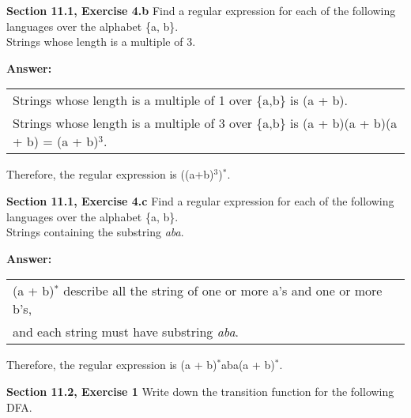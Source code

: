 \documentclass[12pt]{article}
\begin{document}
\textbf{Section 11.1, Exercise 4.b}  Find a regular expression for each of the following languages over the
alphabet \{a, b\}.\\
Strings whose length is a multiple of 3.

\textbf{Answer:}

\begin{center}
\begin{tabular}{l}
Strings whose length is a multiple of 1 over \{a,b\} is (a + b).\\
Strings whose length is a multiple of 3 over \{a,b\} is (a + b)(a + b)(a + b) = (a + b)$^3$.\\
\end{tabular}
\end{center}

\begin{center}
Therefore, the regular expression is ((a+b)$^3$)$^*$.\\
\end{center}

\textbf{Section 11.1, Exercise 4.c}  Find a regular expression for each of the following languages over the
alphabet \{a, b\}.\\
 Strings containing the substring \emph{aba}.
 
\textbf{Answer:}

\begin{center}
\begin{tabular}{l}
(a + b)$^*$ describe all the string of one or more a's and one or more b's, \\
and each string must have substring \emph{aba}.\\
\end{tabular}
\end{center}

\begin{center}
Therefore, the regular expression is (a + b)$^*$aba(a + b)$^*$.\\
\end{center}

\textbf{Section 11.2, Exercise 1} Write down the transition function for the following DFA.

\end{document}
